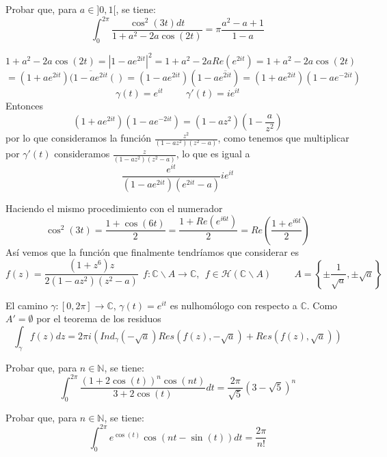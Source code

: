\begin{ejer}
	Probar que, para $a\in]0,1[$, se tiene:
	$$ \int_0^{2\pi} \frac{\cos^2(3t)dt}{1+a^2-2a\cos(2t)} = \pi\frac{a^2-a+1}{1-a} $$
\end{ejer}

\begin{sol}
	
	$$1+a^2-2a\cos(2 t) = |1-ae^{2it}|^2 = 1+a^2-2aRe(e^{2it}) =  1+a^2-2a\cos(2t)$$
	$$ = (1+ae^{2it})(\overline{1-ae^{2it}}()
	= (1-ae^{2it})(1-a\overline{e^{2it}}) = (1+ae^{2it})(1-ae^{-2it})$$
	$$\gamma(t) = e^{it} \hspace{1cm} \gamma'(t) = ie^{it}$$
	Entonces
	$$(1+ae^{2it})(1-ae^{-2it}) = (1-az^2)(1-\frac{a}{z^2})$$
	por lo que consideramos la función $\frac{z^2}{(1-az^2)(z^2-a)}$, 
	como tenemos que multiplicar por $\gamma'(t)$ consideramos $\frac{z}{(1-az^2)(z^2-a)}$, lo que es igual a
	$$\frac{e^{it}}{(1-ae^{2it})(e^{2it}-a)} ie^{it}$$
	
	Haciendo el mismo procedimiento con el numerador
	$$\cos^2(3t) = \frac{1+\cos(6t)}{2} = \frac{1+Re(e^{i6t})}{2} = Re(\frac{1+e^{i6t}}{2})$$
	Así vemos que la función que finalmente tendríamos que considerar es
	$$f(z) = \frac{(1+z^6)z}{2(1-az^2)(z^2-a)} \ \ f:\mathbb{C}\backslash A \rightarrow \mathbb{C}, \ \ f\in\mathcal{H}(\mathbb{C}\backslash A) \hspace{1cm} A = \left\{ \pm\frac{1}{\sqrt{a}}, \pm\sqrt{a} \right\}$$
	
	El camino $\gamma:[0,2\pi] \rightarrow \mathbb{C}$, $\gamma(t) = e^{it}$ es nulhomólogo con respecto a $\mathbb{C}$.
	Como $A' = \emptyset$ por el teorema de los residuos
	$$\int_{\gamma} f(z)dz = 2\pi i \left( Ind_{\gamma}(-\sqrt{a})Res(f(z),-\sqrt{a}) + Res(f(z), \sqrt{a}) \right)$$
\end{sol}

\begin{ejer}
	Probar que, para $n\in\mathbb{N}$, se tiene:
	$$ \int_0^{2\pi} \frac{(1+2\cos(t))^n \cos(nt)}{3+2\cos(t)} dt = \frac{2\pi}{\sqrt{5}} (3-\sqrt{5})^n $$
\end{ejer}


\begin{ejer}
	Probar que, para $n\in\mathbb{N}$, se tiene:
	$$ \int_{0}^{2\pi} e^{\cos(t)} \cos(nt-\sin(t))dt = \frac{2\pi}{n!} $$
\end{ejer}


